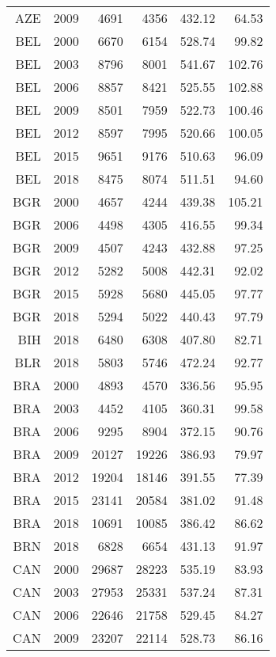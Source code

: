 \begin{longtable}{|r|r|r|r|r|r|}
    AZE   & 2009  & 4691  & 4356  & 432.12 & 64.53 \\
    BEL   & 2000  & 6670  & 6154  & 528.74 & 99.82 \\
    BEL   & 2003  & 8796  & 8001  & 541.67 & 102.76 \\
    BEL   & 2006  & 8857  & 8421  & 525.55 & 102.88 \\
    BEL   & 2009  & 8501  & 7959  & 522.73 & 100.46 \\
    BEL   & 2012  & 8597  & 7995  & 520.66 & 100.05 \\
    BEL   & 2015  & 9651  & 9176  & 510.63 & 96.09 \\
    BEL   & 2018  & 8475  & 8074  & 511.51 & 94.60 \\
    BGR   & 2000  & 4657  & 4244  & 439.38 & 105.21 \\
    BGR   & 2006  & 4498  & 4305  & 416.55 & 99.34 \\
    BGR   & 2009  & 4507  & 4243  & 432.88 & 97.25 \\
    BGR   & 2012  & 5282  & 5008  & 442.31 & 92.02 \\
    BGR   & 2015  & 5928  & 5680  & 445.05 & 97.77 \\
    BGR   & 2018  & 5294  & 5022  & 440.43 & 97.79 \\
    BIH   & 2018  & 6480  & 6308  & 407.80 & 82.71 \\
    BLR   & 2018  & 5803  & 5746  & 472.24 & 92.77 \\
    BRA   & 2000  & 4893  & 4570  & 336.56 & 95.95 \\
    BRA   & 2003  & 4452  & 4105  & 360.31 & 99.58 \\
    BRA   & 2006  & 9295  & 8904  & 372.15 & 90.76 \\
    BRA   & 2009  & 20127 & 19226 & 386.93 & 79.97 \\
    BRA   & 2012  & 19204 & 18146 & 391.55 & 77.39 \\
    BRA   & 2015  & 23141 & 20584 & 381.02 & 91.48 \\
    BRA   & 2018  & 10691 & 10085 & 386.42 & 86.62 \\
    BRN   & 2018  & 6828  & 6654  & 431.13 & 91.97 \\
    CAN   & 2000  & 29687 & 28223 & 535.19 & 83.93 \\
    CAN   & 2003  & 27953 & 25331 & 537.24 & 87.31 \\
    CAN   & 2006  & 22646 & 21758 & 529.45 & 84.27 \\
    CAN   & 2009  & 23207 & 22114 & 528.73 & 86.16 \\

\end{longtable}

